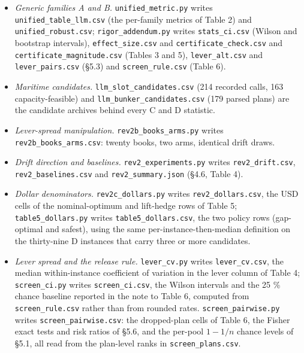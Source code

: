 \documentclass[preprint,12pt,letterpaper]{elsarticle}
\theoremstyle{definition}
\theoremstyle{plain}
\begin{document}
\begin{itemize}
\item \textit{Generic families A and B.} \texttt{unified\_\allowbreak{}metric.\allowbreak{}py} writes \texttt{unified\_\allowbreak{}table\_\allowbreak{}llm.\allowbreak{}csv} (the per-family metrics of Table 2) and \texttt{unified\_\allowbreak{}robust.\allowbreak{}csv}; \texttt{rigor\_\allowbreak{}addendum.\allowbreak{}py} writes \texttt{stats\_\allowbreak{}ci.\allowbreak{}csv} (Wilson and bootstrap intervals), \texttt{effect\_\allowbreak{}size.\allowbreak{}csv} and \texttt{certificate\_\allowbreak{}check.\allowbreak{}csv} and \texttt{certificate\_\allowbreak{}magnitude.\allowbreak{}csv} (Tables 3 and 5), \texttt{lever\_\allowbreak{}alt.\allowbreak{}csv} and \texttt{lever\_\allowbreak{}pairs.\allowbreak{}csv} (\S 5.3) and \texttt{screen\_\allowbreak{}rule.\allowbreak{}csv} (Table 6).
\item \textit{Maritime candidates.} \texttt{llm\_\allowbreak{}slot\_\allowbreak{}candidates.\allowbreak{}csv} (214 recorded calls, 163 capacity-feasible) and \texttt{llm\_\allowbreak{}bunker\_\allowbreak{}candidates.\allowbreak{}csv} (179 parsed plans) are the candidate archives behind every C and D statistic.
\item \textit{Lever-spread manipulation.} \texttt{rev2b\_\allowbreak{}books\_\allowbreak{}arms.\allowbreak{}py} writes \texttt{rev2b\_\allowbreak{}books\_\allowbreak{}arms.\allowbreak{}csv}: twenty books, two arms, identical drift draws.
\item \textit{Drift direction and baselines.} \texttt{rev2\_\allowbreak{}experiments.\allowbreak{}py} writes \texttt{rev2\_\allowbreak{}drift.\allowbreak{}csv}, \texttt{rev2\_\allowbreak{}baselines.\allowbreak{}csv} and \texttt{rev2\_\allowbreak{}summary.\allowbreak{}json} (\S 4.6, Table 4).
\item \textit{Dollar denominators.} \texttt{rev2c\_\allowbreak{}dollars.\allowbreak{}py} writes \texttt{rev2\_\allowbreak{}dollars.\allowbreak{}csv}, the USD cells of the nominal-optimum and lift-hedge rows of Table 5; \texttt{table5\_\allowbreak{}dollars.\allowbreak{}py} writes \texttt{table5\_\allowbreak{}dollars.\allowbreak{}csv}, the two policy rows (gap-optimal and safest), using the same per-instance-then-median definition on the thirty-nine D instances that carry three or more candidates.
\item \textit{Lever spread and the release rule.} \texttt{lever\_\allowbreak{}cv.\allowbreak{}py} writes \texttt{lever\_\allowbreak{}cv.\allowbreak{}csv}, the median within-instance coefficient of variation in the lever column of Table 4; \texttt{screen\_\allowbreak{}ci.\allowbreak{}py} writes \texttt{screen\_\allowbreak{}ci.\allowbreak{}csv}, the Wilson intervals and the 25 \% chance baseline reported in the note to Table 6, computed from \texttt{screen\_\allowbreak{}rule.\allowbreak{}csv} rather than from rounded rates. \texttt{screen\_\allowbreak{}pairwise.\allowbreak{}py} writes \texttt{screen\_\allowbreak{}pairwise.\allowbreak{}csv}: the dropped-plan cells of Table 6, the Fisher exact tests and risk ratios of \S 5.6, and the per-pool $1 - 1/n$ chance levels of \S 5.1, all read from the plan-level ranks in \texttt{screen\_\allowbreak{}plans.\allowbreak{}csv}.

\end{itemize}
\end{document}
